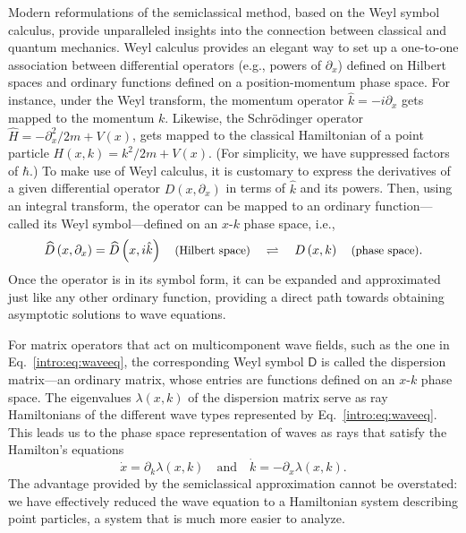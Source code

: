 Modern reformulations of the semiclassical method, based on the Weyl symbol calculus, provide unparalleled insights into the connection between classical and quantum mechanics.
Weyl calculus provides an elegant way to set up a one-to-one association between differential operators (e.g., powers of $\partial_{x}$) defined on Hilbert spaces and ordinary functions defined on a position-momentum phase space.
For instance, under the Weyl transform, the momentum operator $\hat{k} = -i\partial_{x}$ gets mapped to the momentum $k$.
Likewise, the Schr\"{o}dinger operator $\widehat{H} = -\partial_{x}^{2}/2m + V(x)$, gets mapped to the classical Hamiltonian of a point particle $H(x, k) = k^{2}/2m + V(x)$.
(For simplicity, we have suppressed factors of $\hbar$.)
To make use of Weyl calculus, it is customary to express the derivatives of a given differential operator $D(x, \partial_{x})$ in terms of $\hat{k}$ and its powers.
Then, using an integral transform, the operator can be mapped to an ordinary function---called its Weyl symbol---defined on an $x$-$k$ phase space, i.e.,
%
\begin{equation}
  \widehat{D}\left(x, \partial_{x}\right) = \widehat{D}\left(x, i\hat{k}\right) \quad\text{\small(Hilbert space)} \quad\rightleftharpoons{}\quad D\left(x, k\right) \quad\text{\small(phase space)}.
\end{equation}
%
Once the operator is in its symbol form, it can be expanded and approximated just like any other ordinary function, providing a direct path towards obtaining asymptotic solutions to wave equations.

For matrix operators that act on multicomponent wave fields, such as the one in Eq.~\eqref{intro:eq:waveeq}, the corresponding Weyl symbol $\mathsf{D}$ is called the dispersion matrix---an ordinary matrix, whose entries are functions defined on an $x$-$k$ phase space.
The eigenvalues $\lambda(x, k)$ of the dispersion matrix serve as ray Hamiltonians of the different wave types represented by Eq.~\eqref{intro:eq:waveeq}.
This leads us to the phase space representation of waves as rays that satisfy the Hamilton's equations
%
\begin{equation}
\dot{x} = \partial_{k}\lambda(x,k)
\quad\text{and}\quad
\dot{k} = -\partial_{x}\lambda(x, k).
\end{equation}
%
The advantage provided by the semiclassical approximation cannot be overstated: we have effectively reduced the wave equation to a Hamiltonian system describing point particles, a system that is much more easier to analyze.

